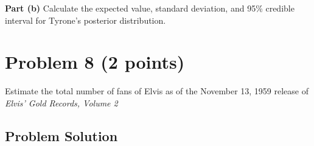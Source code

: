 \documentclass[12pt]{article}
\theoremstyle{definition}
\begin{document}
\noindent
{\bf Part (b)} Calculate the expected value, standard deviation, and 95\% credible interval for Tyrone's posterior distribution.



\newpage
\section*{Problem 8 (2 points)}

Estimate the total number of fans of Elvis as of the November 13, 1959 release of {\em Elvis' Gold Records, Volume 2}

\subsection*{Problem Solution}
\end{document}
